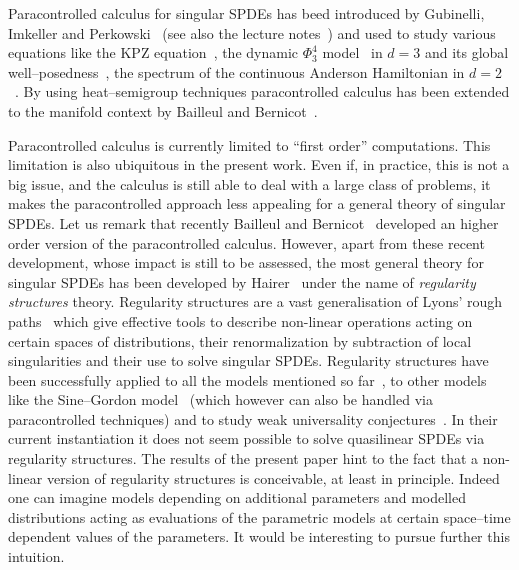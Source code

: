 \documentclass{amsart}
\newcommand{\tmtextit}[1]{{\itshape{#1}}}
\theoremstyle{remark}
\theoremstyle{definition}
\begin{document}
Paracontrolled calculus for singular SPDEs has beed introduced by Gubinelli,
Imkeller and Perkowski~{\cite{gubinelli_paracontrolled_2015}} (see also the
lecture notes~{\cite{gubinelli_lectures_2015}}) and used to study various
equations like the KPZ equation~{\cite{gubinelli_kpz_2015}}, the dynamic
$\Phi^4_3$ model~{\cite{catellier_paracontrolled_2013}} in $d = 3$ and its
global well--posedness~{\cite{mourrat_global_2016}}, the spectrum of the
continuous Anderson Hamiltonian in $d = 2$~{\cite{allez_continuous_2015}}. By
using heat--semigroup techniques paracontrolled calculus has been extended to
the manifold context by Bailleul and Bernicot~{\cite{bailleul_heat_2015}}.

Paracontrolled calculus is currently limited to ``first order'' computations.
This limitation is also ubiquitous in the present work. Even if, in practice,
this is not a big issue, and the calculus is still able to deal with a large
class of problems, it makes the paracontrolled approach less appealing for a
general theory of singular SPDEs. Let us remark that recently Bailleul and
Bernicot~{\cite{bailleul_higher_2016}} developed an higher order version of
the paracontrolled calculus. However, apart from these recent development,
whose impact is still to be assessed, the most general theory for singular
SPDEs has been developed by
Hairer~{\cite{hairer_theory_2014,hairer_singular_2014,friz_course_2014}} under
the name of \tmtextit{regularity structures} theory. Regularity structures are
a vast generalisation of Lyons' rough
paths~{\cite{lyons_differential_1998,lyons_system_2002,lyons_differential_2007}}
which give effective tools to describe non-linear operations acting on certain
spaces of distributions, their renormalization by subtraction of local
singularities and their use to solve singular SPDEs. Regularity structures
have been successfully applied to all the models mentioned so
far~{\cite{hairer_theory_2014,hairer_solving_2013}}, to other models like the
Sine--Gordon model~{\cite{hairer_dynamical_2014}} (which however can also be
handled via paracontrolled techniques) and to study weak universality
conjectures~{\cite{hairer_class_2015,hairer_large_2016}}. In their current
instantiation it does not seem possible to solve quasilinear SPDEs via
regularity structures. The results of the present paper hint to the fact that
a non-linear version of regularity structures is conceivable, at least in
principle. Indeed one can imagine models depending on additional parameters
and modelled distributions acting as evaluations of the parametric models at
certain space--time dependent values of the parameters. It would be
interesting to pursue further this intuition.
\end{document}

